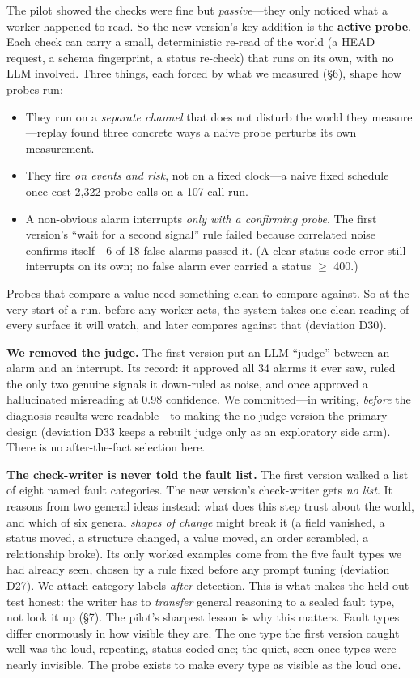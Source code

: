 \documentclass[acmsmall,screen]{acmart}
\begin{document}
The pilot showed the checks were fine but \emph{passive}---they only noticed
what a worker happened to read. So the new version's key addition is the
\textbf{active probe}. Each check can carry a small, deterministic re-read of
the world (a HEAD request, a schema fingerprint, a status re-check) that runs on
its own, with no LLM involved. Three things, each forced by what we measured
(\S6), shape how probes run:

\begin{itemize}
  \item They run on a \emph{separate channel} that does not disturb the world
  they measure---replay found three concrete ways a naive probe perturbs its
  own measurement.
  \item They fire \emph{on events and risk}, not on a fixed clock---a naive
  fixed schedule once cost 2,322 probe calls on a 107-call run.
  \item A non-obvious alarm interrupts \emph{only with a confirming probe}. The
  first version's ``wait for a second signal'' rule failed because correlated
  noise confirms itself---6 of 18 false alarms passed it. (A clear status-code
  error still interrupts on its own; no false alarm ever carried a status
  $\ge$ 400.)
\end{itemize}

Probes that compare a value need something clean to compare against. So at the
very start of a run, before any worker acts, the system takes one clean reading
of every surface it will watch, and later compares against that (deviation D30).

\textbf{We removed the judge.} The first version put an LLM ``judge'' between an
alarm and an interrupt. Its record: it approved all 34 alarms it ever saw,
ruled the only two genuine signals it down-ruled as noise, and once approved a
hallucinated misreading at 0.98 confidence. We committed---in writing,
\emph{before} the diagnosis results were readable---to making the no-judge
version the primary design (deviation D33 keeps a rebuilt judge only as an
exploratory side arm). There is no after-the-fact selection here.

\textbf{The check-writer is never told the fault list.} The first version
walked a list of eight named fault categories. The new version's check-writer
gets \emph{no list}. It reasons from two general ideas instead: what does this
step trust about the world, and which of six general \emph{shapes of change}
might break it (a field vanished, a status moved, a structure changed, a value
moved, an order scrambled, a relationship broke). Its only worked examples come
from the five fault types we had already seen, chosen by a rule fixed before any
prompt tuning (deviation D27). We attach category labels \emph{after} detection.
This is what makes the held-out test honest: the writer has to \emph{transfer}
general reasoning to a sealed fault type, not look it up (\S7). The pilot's
sharpest lesson is why this matters. Fault types differ enormously in how
visible they are. The one type the first version caught well was the loud,
repeating, status-coded one; the quiet, seen-once types were nearly invisible.
The probe exists to make every type as visible as the loud one.
\end{document}
